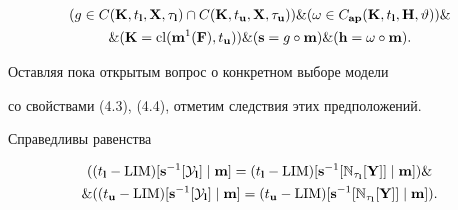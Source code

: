 \begin{multline}


(g \in C({\bold K},{t_{\bold l}},{\bold X},{{\tau}_{\bold l}}) \cap


C({\bold K},{t_{\bold u}},{\bold X},{{\tau}_{\bold u}})) \& (\omega \in


{C_{{\bold a}{\bold p}}}({\bold K},{t_{\bold l}},{\bold H},\vt)) \&\\


\& ({\bold K} = {\cl}({{\bold m}^1}({\bold F}),{t_{\bold u}})) \&


({\bold s} = g \circ {\bold m}) \& ({\bold h} = \omega \circ {\bold m}).


\end{multline}


Оставляя пока открытым вопрос о конкретном выборе модели


со свойствами (4.3), (4.4), отметим следствия этих предположений.





\begin{props}


Справедливы равенства


\begin{multline*}


(({t_{\bold l}} - {\LIM})[{{\bold s}^{-1}}[{\cal Y}_{\bold l}]


\mid {\bold m}] =


({t_{\bold l}} - {\LIM})[{{\bold s}^{-1}}


[{{\Bbb N}_{{\tau}_{\bold l}}}[{\bold Y}]]


\mid {\bold m}]) \&\\


\& (({t_{\bold u}} - {\LIM})[{{\bold s}^{-1}}[{\cal Y}_{\bold l}] \mid


{\bold m}] = ({t_{\bold u}} -


{\LIM})[{{\bold s}^{-1}}


[{{\Bbb N}_{{\tau}_{\bold l}}}[{\bold Y}]] \mid {\bold m}]).


\end{multline*}


\end{props}





